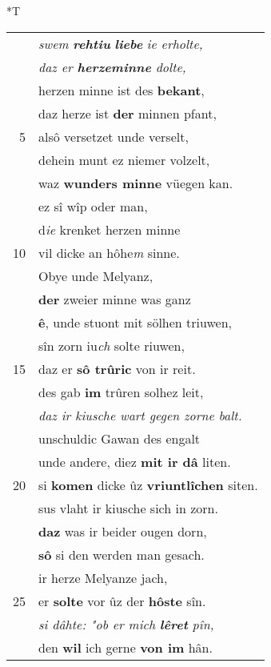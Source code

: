 \documentclass[8pt,a4paper,notitlepage]{article}
\begin{document}
\begin{table}[ht]
\begin{minipage}[t]{0.5\linewidth}
\end{minipage}
\hspace{0.5cm}
\begin{minipage}[t]{0.5\linewidth}
\small
\begin{center}*T
\end{center}
\begin{tabular}{rl}
 & \textit{swem} \textit{\textbf{rehtiu}} \textit{\textbf{liebe}} \textit{ie erholte,}\\ 
 & \textit{daz er \textbf{herzeminne} dolte,}\\ 
 & herzen minne ist des \textbf{bekant},\\ 
 & daz herze ist \textbf{der} minnen pfant,\\ 
5 & alsô versetzet unde verselt,\\ 
 & dehein munt ez niemer volzelt,\\ 
 & waz \textbf{wunders minne} vüegen kan.\\ 
 & ez sî wîp oder man,\\ 
 & d\textit{ie} krenket herzen minne\\ 
10 & vil dicke an hôhe\textit{m} sinne.\\ 
 & Obye unde Melyanz,\\ 
 & \textbf{der} zweier minne was ganz\\ 
 & \textbf{ê}, unde stuont mit sölhen triuwen,\\ 
 & sîn zorn iu\textit{ch} solte riuwen,\\ 
15 & daz er \textbf{sô trûric} von ir reit.\\ 
 & des gab \textbf{im} trûren solhez leit,\\ 
 & \textit{daz ir kiusche wart gegen zorne balt.}\\ 
 & unschuldic Gawan des engalt\\ 
 & unde andere, diez \textbf{mit ir dâ} liten.\\ 
20 & si \textbf{komen} dicke ûz \textbf{vriuntlîchen} siten.\\ 
 & sus vlaht ir kiusche sich in zorn.\\ 
 & \textbf{daz} was ir beider ougen dorn,\\ 
 & \textbf{sô} si den werden man gesach.\\ 
 & ir herze Melyanze jach,\\ 
25 & er \textbf{solte} vor ûz der \textbf{hôste} sîn.\\ 
 & \textit{si dâhte: "ob er mich \textbf{lêret} pîn,}\\ 
 & den \textbf{wil} ich gerne \textbf{von im} hân.\\ 

\end{tabular}
\end{minipage}
\end{table}
\end{document}
